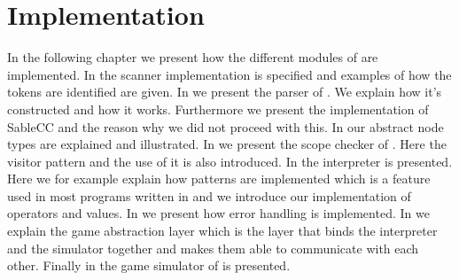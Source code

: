 \chapter{Implementation}
\label{chap:implementation}

In the following chapter we present how the different modules of \productname{} are implemented. In  the scanner implementation is specified and examples of how the tokens are identified are given. In  we present the parser of
\productname{}. We explain how it's constructed and how it works. Furthermore we present the implementation of SableCC and the reason why we did not proceed with this. In  our abstract node types are explained and illustrated. In  we present the scope checker of \productname{}. Here the visitor pattern and the use of it is also introduced. In  the interpreter is presented. Here we for example explain how patterns are implemented which is a feature used in most programs written in \productname{} and we introduce our implementation of operators and values. In  we present how error handling is implemented. In  we explain the game abstraction layer which is the layer that binds the interpreter and the simulator together and makes them able to communicate with each other. Finally in  the game simulator of \productname{} is presented.    










